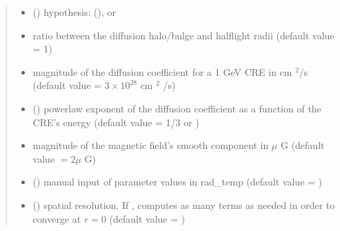 \documentclass[letterpaper,10pt,english]{sphinxmanual}
\begin{document}
\begin{fulllineitems}
\begin{quote}
\begin{description}
\begin{itemize}
\item {} 
\sphinxAtStartPar
{} () \textendash{} hypothesis:  (),  or 

\item {} 
\sphinxAtStartPar
{} \textendash{} ratio between the diffusion halo/bulge and half\sphinxhyphen{}light radii (default value = 1)

\item {} 
\sphinxAtStartPar
{} \textendash{} magnitude of the diffusion coefficient for a 1 GeV CRE in cm \({}^2\)/s (default value = \(3\times 10^{28}\) cm \({}^2\) /s)

\item {} 
\sphinxAtStartPar
{} (\sphinxstyleliteralemphasis{\sphinxupquote{, }}) \textendash{} power\sphinxhyphen{}law exponent of the diffusion coefficient as a function of the CRE’s energy (default value = 1/3 or )

\item {} 
\sphinxAtStartPar
{} \textendash{} magnitude of the magnetic field’s smooth component in \(\mu\) G (default value \(= 2 \mu\) G)

\item {} 
\sphinxAtStartPar
{} () \textendash{} manual input of parameter values in rad\_temp (default value = )

\item {} 
\sphinxAtStartPar
{} () \textendash{} spatial resolution. If , {\hyperref[\detokenize{diffsph:diffsph.pyflux.synch_emissivity}]{}} computes as many terms as needed in order to converge at \(r=0\) (default value = )


\end{itemize}
\end{description}
\end{quote}
\end{fulllineitems}
\end{document}
